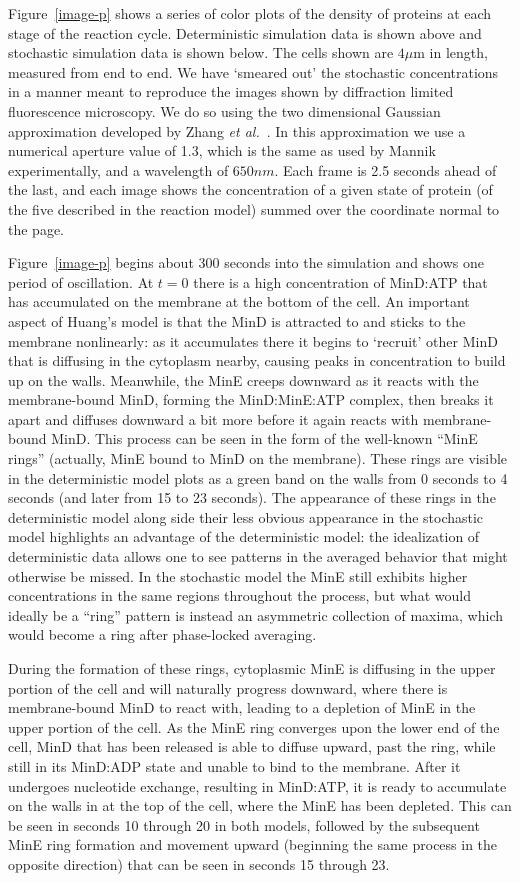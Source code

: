 \documentclass[10pt,letterpaper]{article}
\newcommand\micron{\ensuremath{\mu\text{m}}}
\begin{document}
Figure~\ref{image-p} shows a series of color plots of the density of
proteins at each stage of the reaction cycle. Deterministic simulation
data is shown above and stochastic simulation data is shown below.
The cells shown are $4\micron$ in length, measured from end to end.
We have `smeared out' the stochastic concentrations in a manner meant
to reproduce the images shown by diffraction limited fluorescence
microscopy.  We do so using the two dimensional Gaussian approximation
developed by Zhang \emph{et al.}~\cite{zhang2007gaussian}.  In this
approximation we use a numerical aperture value of 1.3, which is the
same as used by Mannik experimentally, and a wavelength of $650nm$.
Each frame is 2.5 seconds ahead of the last, and each image shows the
concentration of a given state of protein (of the five described in
the reaction model) summed over the coordinate normal to the page.

Figure~\ref{image-p} begins about 300 seconds into the simulation and
shows one period of oscillation.  At $t=0$ there is a high
concentration of MinD:ATP that has accumulated on the membrane at the
bottom of the cell. An important aspect of Huang's model is that the
MinD is attracted to and sticks to the membrane nonlinearly: as it
accumulates there it begins to `recruit' other MinD that is diffusing
in the cytoplasm nearby, causing peaks in concentration to build up on
the walls.  Meanwhile, the MinE creeps downward as it reacts with the
membrane-bound MinD, forming the MinD:MinE:ATP complex, then breaks it
apart and diffuses downward a bit more before it again reacts with
membrane-bound MinD.  This process can be seen in the form of the
well-known ``MinE rings'' (actually, MinE bound to MinD on the
membrane).  These rings are visible in the deterministic model plots
as a green band on the walls from 0 seconds to 4 seconds (and later
from 15 to 23 seconds).  The appearance of these rings in the
deterministic model along side their less obvious appearance in the
stochastic model highlights an advantage of the deterministic model:
the idealization of deterministic data allows one to see patterns in
the averaged behavior that might otherwise be missed.  In the
stochastic model the MinE still exhibits higher concentrations in the
same regions throughout the process, but what would ideally be a
``ring'' pattern is instead an asymmetric collection of maxima, which
would become a ring after phase-locked averaging.

During the formation of these rings, cytoplasmic MinE is diffusing in
the upper portion of the cell and will naturally progress downward,
where there is membrane-bound MinD to react with, leading to a
depletion of MinE in the upper portion of the cell.  As the MinE ring
converges upon the lower end of the cell, MinD that has been released
is able to diffuse upward, past the ring, while still in its MinD:ADP
state and unable to bind to the membrane.  After it undergoes
nucleotide exchange, resulting in MinD:ATP, it is ready to accumulate
on the walls in at the top of the cell, where the MinE has been
depleted.  This can be seen in seconds 10 through 20 in both models,
followed by the subsequent MinE ring formation and movement upward
(beginning the same process in the opposite direction) that can be
seen in seconds 15 through 23.
\end{document}
